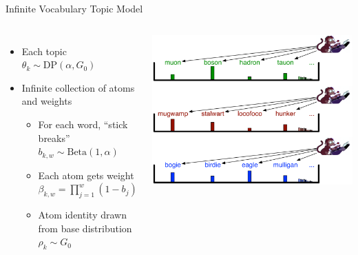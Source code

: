 \documentclass[xcolor=dvipsnames]{beamer}
\begin{document}

\begin{frame}{Infinite Vocabulary Topic Model}

  \begin{columns}
     \begin{itemize}
       \item Each topic $\theta_k \sim \mbox{DP}(\alpha, G_0)$
       \item Infinite collection of atoms and weights
     \begin{itemize}
       \item For each word, ``stick breaks'' \alert<2>{$b_{k, w} \sim \mbox{Beta}(1,\alpha)$}
       \item Each atom gets weight \alert<3>{$\beta_{k, w} = \prod_{j=1}^{w} (1 - b_j)$}
       \item Atom identity drawn from base distribution $\rho_k \sim G_0$
     \end{itemize}
     \end{itemize}
       \includegraphics[width=1.0\linewidth]{infvoc/dp_monkey-topics}
  \end{columns}

\end{frame}

\end{document}
